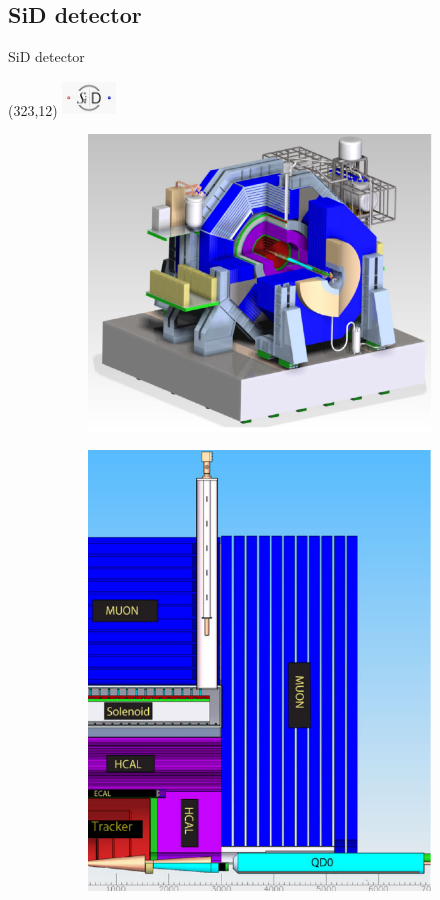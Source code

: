 \documentclass[xcolor={dvipsnames}]{beamer}
\newcommand{\sidlogo}{
  \setlength{\TPHorizModule}{1pt}
  \setlength{\TPVertModule}{1pt}
  \begin{textblock}{1}(323,12)
   \includegraphics[width=40pt,height=26pt]{figures/SiD.jpeg}
  \end{textblock}
  }
\begin{document}
\subsection{SiD detector}
\begin{frame}{SiD detector}
\sidlogo
\begin{figure}[T]
\centering
\begin{subfigure}[b]{0.49\textwidth}
\centering
\includegraphics[height=0.6\textheight]{figures/SiD_detector_model.pdf}
\end{subfigure}
\begin{subfigure}[b]{0.49\textwidth}
\centering
\includegraphics[height=0.6\textheight]{figures/SiD_detector_model_Ausschnitt.pdf}

\end{subfigure}
\end{figure}
\end{frame}
\end{document}

